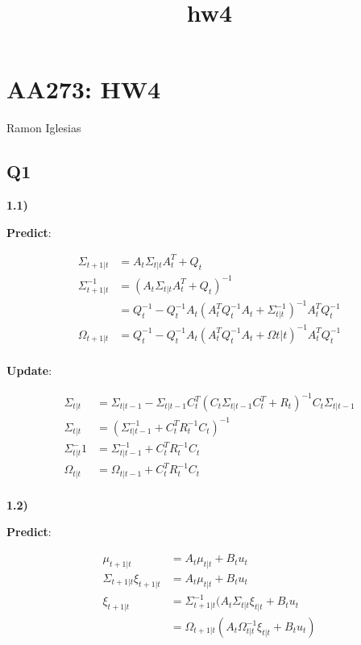 \documentclass[11pt]{article}
\title{hw4}
\begin{document}
    
    
    \maketitle
    
    

    
    \section{AA273: HW4}\label{aa273-hw4}

Ramon Iglesias

    \subsection{Q1}\label{q1}

\textbf{1.1)}

\textbf{Predict}:

\begin{align}
\Sigma_{t + 1| t} & = A_{t} \Sigma_{t | t} A_{t}^T + Q_{t} \\
\Sigma_{t + 1| t}^{-1} & = (A_{t} \Sigma_{t | t} A_{t}^T + Q_{t})^{-1} \\
& = Q_{t}^{-1} - Q_{t}^{-1} A_{t} (A_t^T Q_{t}^{-1} A_t + \Sigma_{t|t}^{-1})^{-1} A_t^T Q_{t}^{-1} \\
\Omega_{t + 1|t}& = Q_{t}^{-1} - Q_{t}^{-1} A_{t} (A_t^T Q_{t}^{-1} A_t + \Omega{t|t})^{-1} A_t^T Q_{t}^{-1} \\
\end{align}

\textbf{Update}:

\begin{align}
\Sigma_{t | t} & = \Sigma_{t | t -1} - \Sigma_{t | t -1} C_t^T (C_t \Sigma_{t | t -1} C_t^T + R_t) ^ {-1} C_t \Sigma_{t | t -1} \\
\Sigma_{t | t} & = (\Sigma_{t | t -1}^{-1} + C_t^T R_{t}^{-1} C_t ) ^{-1}\\
\Sigma_{t | t}^-1 & = \Sigma_{t | t -1}^{-1} + C_t^T R_{t}^{-1} C_t \\
\Omega_{t | t} & = \Omega_{t | t -1} + C_t^T R_{t}^{-1} C_t \\
\end{align}

    \textbf{1.2)}

\textbf{Predict}:

\begin{align}
\mu_{t + 1 | t} &=  A_t \mu_{t | t} + B_t u_t \\
\Sigma_{t+1 | t} \xi_{t + 1 | t} &=  A_t \mu_{t | t} + B_t u_t \\
\xi_{t + 1 | t} &= \Sigma_{t+1 | t}^{-1}  (A_t \Sigma_{t | t} \xi_{t | t}  + B_t u_t \\
&= \Omega_{t+1 | t}  (A_t \Omega_{t | t}^{-1} \xi_{t | t}  + B_t u_t )\\
\end{align}
\end{document}
